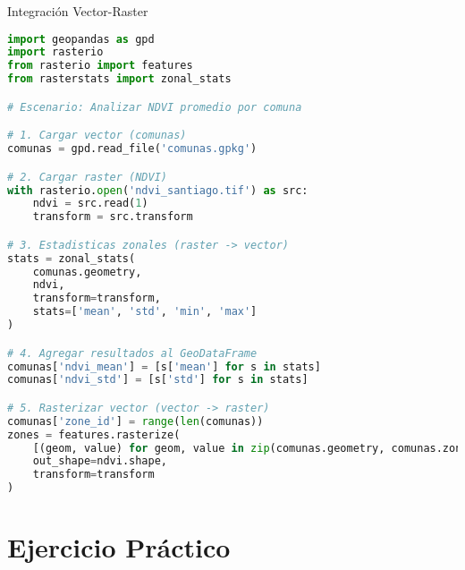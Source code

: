 \documentclass[10pt]{beamer}
\begin{document}
\begin{frame}[fragile]{Integración Vector-Raster}
    \begin{lstlisting}[language=Python, caption=Análisis combinado]
import geopandas as gpd
import rasterio
from rasterio import features
from rasterstats import zonal_stats

# Escenario: Analizar NDVI promedio por comuna

# 1. Cargar vector (comunas)
comunas = gpd.read_file('comunas.gpkg')

# 2. Cargar raster (NDVI)
with rasterio.open('ndvi_santiago.tif') as src:
    ndvi = src.read(1)
    transform = src.transform

# 3. Estadisticas zonales (raster -> vector)
stats = zonal_stats(
    comunas.geometry, 
    ndvi, 
    transform=transform,
    stats=['mean', 'std', 'min', 'max']
)

# 4. Agregar resultados al GeoDataFrame
comunas['ndvi_mean'] = [s['mean'] for s in stats]
comunas['ndvi_std'] = [s['std'] for s in stats]

# 5. Rasterizar vector (vector -> raster)
comunas['zone_id'] = range(len(comunas))
zones = features.rasterize(
    [(geom, value) for geom, value in zip(comunas.geometry, comunas.zone_id)],
    out_shape=ndvi.shape,
    transform=transform
)
    \end{lstlisting}
\end{frame}

\section{Ejercicio Práctico}
\end{document}
